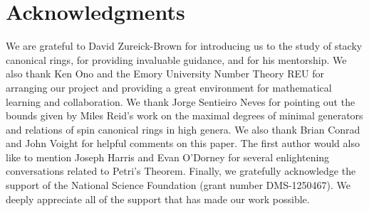 \documentclass{amsart}
\theoremstyle{plain}
\theoremstyle{definition}
\theoremstyle{remark}
\numberwithin{equation}{section}
\begin{document}

\section{Acknowledgments}
We are grateful to David Zureick-Brown for introducing us to the
study of stacky canonical rings, for providing invaluable guidance,
and for his mentorship. We also thank Ken Ono and the Emory
University Number Theory REU for arranging our project and
providing a great environment for mathematical learning and
collaboration. We thank Jorge Sentieiro Neves for pointing out the
bounds given by Miles Reid's work on the maximal degrees of minimal
generators and relations of spin canonical rings in high genera. We
also thank Brian Conrad and John Voight for helpful comments on
this paper. The first author would also like to mention Joseph
Harris and Evan O'Dorney for several enlightening conversations
related to Petri's Theorem. Finally, we gratefully acknowledge the
support of the National Science Foundation (grant number DMS-1250467).
We deeply appreciate all of the support that has made our work
possible.


\nocite{*}
{}

\end{document}
